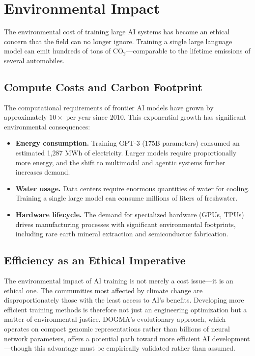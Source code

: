 \section{Environmental Impact}
\label{sec:environmental-impact}

The environmental cost of training large AI systems has become an ethical concern that the field can no longer ignore.
Training a single large language model can emit hundreds of tons of CO$_2$---comparable to the lifetime emissions of several automobiles.

\subsection{Compute Costs and Carbon Footprint}

The computational requirements of frontier AI models have grown by approximately $10\times$ per year since 2010.
This exponential growth has significant environmental consequences:

\begin{itemize}[leftmargin=1.5em]
  \item \textbf{Energy consumption.} Training GPT-3 (175B parameters) consumed an estimated 1,287 MWh of electricity.
  Larger models require proportionally more energy, and the shift to multimodal and agentic systems further increases demand.
  \item \textbf{Water usage.} Data centers require enormous quantities of water for cooling.
  Training a single large model can consume millions of liters of freshwater.
  \item \textbf{Hardware lifecycle.} The demand for specialized hardware (GPUs, TPUs) drives manufacturing processes with significant environmental footprints, including rare earth mineral extraction and semiconductor fabrication.
\end{itemize}

\subsection{Efficiency as an Ethical Imperative}

\begin{keyinsight}
The environmental impact of AI training is not merely a cost issue---it is an ethical one.
The communities most affected by climate change are disproportionately those with the least access to AI's benefits.
Developing more efficient training methods is therefore not just an engineering optimization but a matter of environmental justice.
DOGMA's evolutionary approach, which operates on compact genomic representations rather than billions of neural network parameters, offers a potential path toward more efficient AI development---though this advantage must be empirically validated rather than assumed.
\end{keyinsight}

